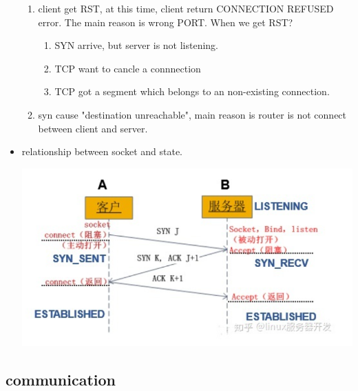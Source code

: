 \documentclass[a4paper,11pt,twoside]{book}
\begin{document}
\begin{itemize}
\begin{enumerate}
		\item client get RST, at this time, client return CONNECTION REFUSED error.  The main reason is wrong PORT.  When we get RST?
		\begin{enumerate}
			\item SYN arrive, but server is not listening. 
			\item TCP want to cancle a connnection
			\item TCP got a segment which belongs to an non-existing connection.
		\end{enumerate}
		\item syn cause "destination unreachable", main reason is router is not connect between client and server.
	\end{enumerate}
	
	
		\item relationship between socket and state.
	
	\begin{center}
		\includegraphics[width=0.85\linewidth]{pics/tcp1.png}
	\end{center}
	
	
\end{itemize}

\subsection{communication}
\end{document}
